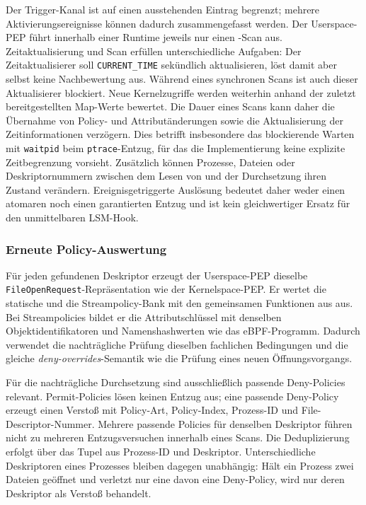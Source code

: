 Der Trigger-Kanal ist auf einen ausstehenden Eintrag begrenzt; mehrere Aktivierungsereignisse können dadurch zusammengefasst werden. Der Userspace-PEP führt innerhalb einer Runtime jeweils nur einen -Scan aus. Zeitaktualisierung und Scan erfüllen unterschiedliche Aufgaben: Der Zeitaktualisierer soll \texttt{CURRENT\_TIME} sekündlich aktualisieren, löst damit aber selbst keine Nachbewertung aus. Während eines synchronen Scans ist auch dieser Aktualisierer blockiert. Neue Kernelzugriffe werden weiterhin anhand der zuletzt bereitgestellten Map-Werte bewertet. Die Dauer eines Scans kann daher die Übernahme von Policy- und Attributänderungen sowie die Aktualisierung der Zeitinformationen verzögern. Dies betrifft insbesondere das blockierende Warten mit \texttt{waitpid} beim \texttt{ptrace}-Entzug, für das die Implementierung keine explizite Zeitbegrenzung vorsieht. Zusätzlich können Prozesse, Dateien oder Deskriptornummern zwischen dem Lesen von  und der Durchsetzung ihren Zustand verändern. Ereignisgetriggerte Auslösung bedeutet daher weder einen atomaren noch einen garantierten Entzug und ist kein gleichwertiger Ersatz für den unmittelbaren LSM-Hook.

\subsubsection{Erneute Policy-Auswertung}
Für jeden gefundenen Deskriptor erzeugt der Userspace-PEP dieselbe \texttt{FileOpenRequest}-Repräsentation wie der Kernelspace-PEP. Er wertet die statische und die Streampolicy-Bank mit den gemeinsamen Funktionen aus  aus. Bei Streampolicies bildet er die Attributschlüssel mit denselben Objektidentifikatoren und Namenshashwerten wie das eBPF-Programm. Dadurch verwendet die nachträgliche Prüfung dieselben fachlichen Bedingungen und die gleiche \emph{deny-overrides}-Semantik wie die Prüfung eines neuen Öffnungsvorgangs.

Für die nachträgliche Durchsetzung sind ausschließlich passende Deny-Policies relevant. Permit-Policies lösen keinen Entzug aus; eine passende Deny-Policy erzeugt einen Verstoß mit Policy-Art, Policy-Index, Prozess-ID und File-Descriptor-Nummer. Mehrere passende Policies für denselben Deskriptor führen nicht zu mehreren Entzugsversuchen innerhalb eines Scans. Die Deduplizierung erfolgt über das Tupel aus Prozess-ID und Deskriptor. Unterschiedliche Deskriptoren eines Prozesses bleiben dagegen unabhängig: Hält ein Prozess zwei Dateien geöffnet und verletzt nur eine davon eine Deny-Policy, wird nur deren Deskriptor als Verstoß behandelt.

